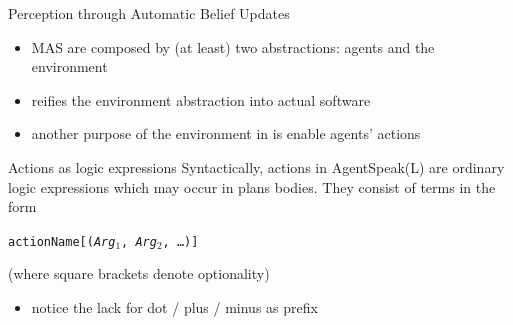 \documentclass[presentation]{beamer}\mode<presentation>{\usetheme{AMSBolognaFC}}
\begin{document}
\begin{frame}[c]{Perception through Automatic Belief Updates}
    
    \begin{itemize}
        \item MAS are composed by (at least) two abstractions: agents and the \alert{environment}
        
        \vfill
        
        \item \jason{} reifies the environment abstraction into actual software
        
        \vfill
        
        \item \alert{another} purpose of the environment in \jason{} is enable agents' \alert{actions}
        
    \end{itemize}
    
    \vfill
    
    \begin{block}{Actions as logic expressions}
        Syntactically, actions in AgentSpeak(L) are ordinary logic expressions which may occur in plans bodies.
        They consist of terms in the form
        \begin{center}
            \texttt{actionName\alert{[}(\textit{Arg}$_1$, \textit{Arg}$_2$, \ldots)\alert{]}}
        \end{center}
        (where square brackets denote optionality)
        \begin{itemize}
            \item notice the lack for dot / plus / minus as prefix
        \end{itemize}
    \end{block}
    
\end{frame} 
\end{document}
